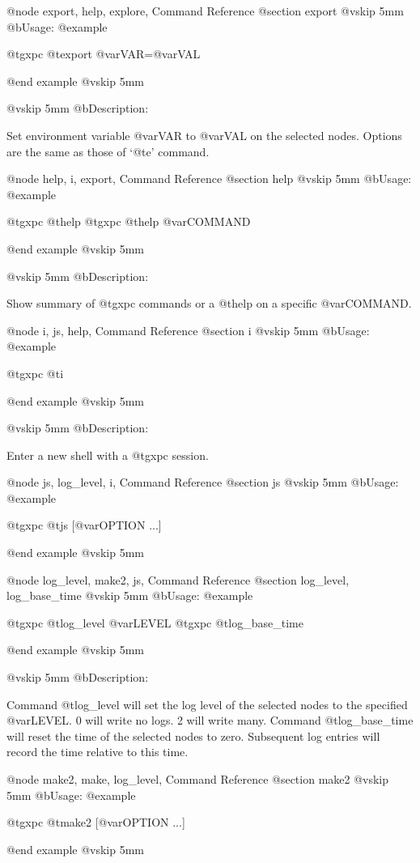 @node export, help, explore, Command Reference
@section export
@vskip 5mm
@b{Usage:}
@example

  @t{gxpc} @t{export} @var{VAR}=@var{VAL}

@end example
@vskip 5mm

@vskip 5mm
@b{Description:}


  Set environment variable @var{VAR} to @var{VAL} on the selected nodes.
Options are the same as those of `@t{e}' command.

@node help, i, export, Command Reference
@section help
@vskip 5mm
@b{Usage:}
@example

  @t{gxpc} @t{help}
  @t{gxpc} @t{help} @var{COMMAND}

@end example
@vskip 5mm

@vskip 5mm
@b{Description:}


  Show summary of @t{gxpc} commands or a @t{help} on a specific @var{COMMAND}.

@node i, js, help, Command Reference
@section i
@vskip 5mm
@b{Usage:}
@example

  @t{gxpc} @t{i}

@end example
@vskip 5mm

@vskip 5mm
@b{Description:}


  Enter a new shell with a @t{gxpc} session.

@node js, log_level, i, Command Reference
@section js
@vskip 5mm
@b{Usage:}
@example

  @t{gxpc} @t{js} [@var{OPTION} ...]

@end example
@vskip 5mm

@node log_level, make2, js, Command Reference
@section log_level, log_base_time
@vskip 5mm
@b{Usage:}
@example

  @t{gxpc} @t{log_level} @var{LEVEL}
  @t{gxpc} @t{log_base_time}

@end example
@vskip 5mm

@vskip 5mm
@b{Description:}


  Command @t{log_level} will set the log level of the selected nodes
to the specified @var{LEVEL}.  0 will write no logs. 2 will write many.
Command @t{log_base_time} will reset the time of the selected nodes
to zero.  Subsequent log entries will record the time relative to
this time.

@node make2, make, log_level, Command Reference
@section make2
@vskip 5mm
@b{Usage:}
@example

  @t{gxpc} @t{make2} [@var{OPTION} ...]

@end example
@vskip 5mm

